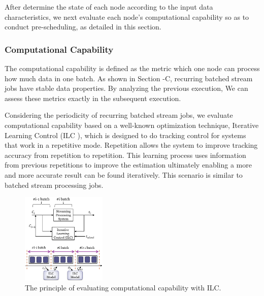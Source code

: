   After determine the state of each node according to the input data characteristics, we next evaluate each node's computational capability so as to conduct pre-scheduling, as detailed in this section.

\subsubsection{Computational Capability}

  The computational capability is defined as the metric which one node can process how much data in one batch. As shown in Section \uppercase\expandafter{}-C, recurring batched stream jobs have stable data properties. By analyzing the previous execution, We can assess these metrics exactly in the subsequent execution.

  Considering the periodicity of recurring batched stream jobs, we evaluate computational capability based on a well-known optimization technique, Iterative Learning Control (ILC \cite{Arimoto}), which is designed to do tracking control for systems that work in a repetitive mode. Repetition allows the system to improve tracking accuracy from repetition to repetition. This learning process uses information from previous repetitions to improve the estimation ultimately enabling a more and more accurate result can be found iteratively. This scenario is similar to batched stream processing jobs.
  \begin{figure}[htbp]
    \centering
    \includegraphics[width=0.36\textwidth]{FigureILC}
    \caption{The principle of evaluating computational capability with ILC.}
    \label{Fig. 7:}
  \end{figure}

